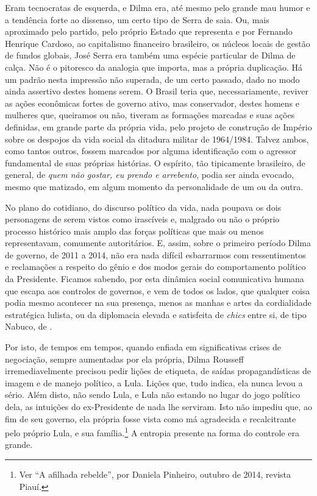 Eram tecnocratas de esquerda, e Dilma era, até mesmo pelo grande mau
humor e a tendência forte ao dissenso, um certo tipo de Serra de saia.
Ou, mais aproximado pelo partido, pelo próprio Estado que representa e
por Fernando Henrique Cardoso, ao capitalismo financeiro brasileiro, os
núcleos locais de gestão de fundos globais, José Serra era também uma
espécie particular de Dilma de calça. Não é o pitoresco da analogia que
importa, mas a própria duplicação. Há um padrão nesta impressão não
superada, de um certo passado, dado no modo ainda assertivo destes
homens serem. O Brasil teria que, necessariamente, reviver as ações
econômicas fortes de governo ativo, mas conservador, destes homens e
mulheres que, queiramos ou não, tiveram as formações marcadas e suas
ações definidas, em grande parte da própria vida, pelo projeto de
construção de Império sobre os despojos da vida social da ditadura
militar de 1964/1984. Talvez ambos, como tantos outros, fossem marcados
por alguma identificação com o agressor fundamental de suas próprias
histórias. O espírito, tão tipicamente brasileiro, de general, de
\emph{quem não gostar, eu prendo e arrebento}, podia ser ainda evocado,
mesmo que matizado, em algum momento da personalidade de um ou da outra.

No plano do cotidiano, do discurso político da vida, nada poupava os
dois personagens de serem vistos como irascíveis e, malgrado ou não o
próprio processo histórico mais amplo das forças políticas que mais ou
menos representavam, comumente autoritários. E, assim, sobre o primeiro
período Dilma de governo, de 2011 a 2014, não era nada difícil
esbarrarmos com ressentimentos e reclamações a respeito do gênio e dos
modos gerais do comportamento político da Presidente. Ficamos sabendo,
por esta dinâmica social comunicativa humana que escapa aos controles de
governos, e vem de todos os lados, que qualquer coisa podia mesmo
acontecer na sua presença, menos as manhas e artes da cordialidade
estratégica lulista, ou da diplomacia elevada e satisfeita de
\emph{chics} entre si, de tipo Nabuco, de .

Por isto, de tempos em tempos, quando enfiada em significativas crises
de negociação, sempre aumentadas por ela própria, Dilma Rousseff
irremediavelmente precisou pedir lições de etiqueta, de saídas
propagandísticas de imagem e de manejo político, a Lula. Lições que,
tudo indica, ela nunca levou a sério. Além disto, não sendo Lula, e Lula
não estando no lugar do jogo político dela, as intuições do
ex-Presidente de nada lhe serviram. Isto não impediu que, ao fim de seu
governo, ela própria fosse vista como má agradecida e recalcitrante pelo
próprio Lula, e sua família.\footnote{Ver ``A afilhada rebelde'', por
  Daniela Pinheiro, outubro de 2014, revista
  Piauí.} A entropia presente na forma do controle
era grande.

